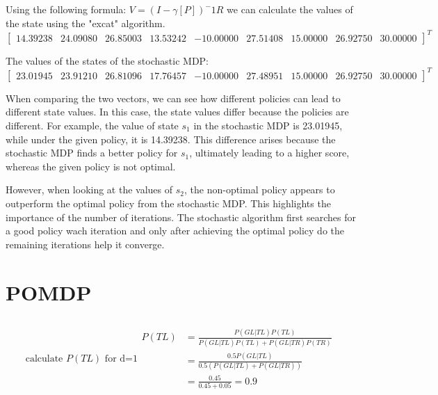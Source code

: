 \documentclass{article}
\begin{document}
    Using the following formula: $V = (I-\gamma[P])^-1R$ we can calculate the values of the state using the "excat" algorithm.\\
    \[ \begin{bmatrix} 14.39238 & 24.09080 & 26.85003 & 13.53242 & -10.00000 & 27.51408 & 15.00000 & 26.92750 & 30.00000 \end{bmatrix}^T \]

    The values of the states of the stochastic MDP:\\
    \[ \begin{bmatrix} 23.01945 & 23.91210 & 26.81096 & 17.76457 & -10.00000 & 27.48951 & 15.00000 & 26.92750 & 30.00000 \end{bmatrix}^T \]

    When comparing the two vectors, we can see how different policies can lead to different state values. In this case, the state values differ because the policies are different. For example, the value of state $s_1$ in the stochastic MDP is 23.01945, while under the given policy, it is 14.39238. This difference arises because the stochastic MDP finds a better policy for $s_1$, ultimately leading to a higher score, whereas the given policy is not optimal.

    However, when looking at the values of $s_2$, the non-optimal policy appears to outperform the optimal policy from the stochastic MDP. This highlights the importance of the number of iterations. The stochastic algorithm first searches for a good policy wach iteration and only after achieving the optimal policy do the remaining iterations help it converge.

    \section{POMDP}
    \subsection{}

    \begin{equation}{\text{calculate $P(TL)$ for d=1}}
        \begin{split}
            P(TL) &= \frac{P(GL|TL)P(TL)}{P(GL|TL)P(TL)+ P(GL|TR)P(TR)}\\
            & = \frac{0.5P(GL|TL)}{0.5(P(GL|TL)+ P(GL|TR))}\\
            & = \frac{0.45}{0.45+0.05} = 0.9
        \end{split}
    \end{equation}
    
\end{document}

